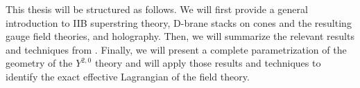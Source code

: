 This thesis will be structured as follows. We will first provide a general introduction to IIB superstring theory, D-brane stacks on cones and the resulting gauge field theories, and holography. Then, we will summarize the relevant results and techniques from \cite{MZ}. Finally, we will present a complete parametrization of the geometry of the $Y^{2,0}$ theory and will apply those results and techniques to identify the exact effective Lagrangian of the field theory.


